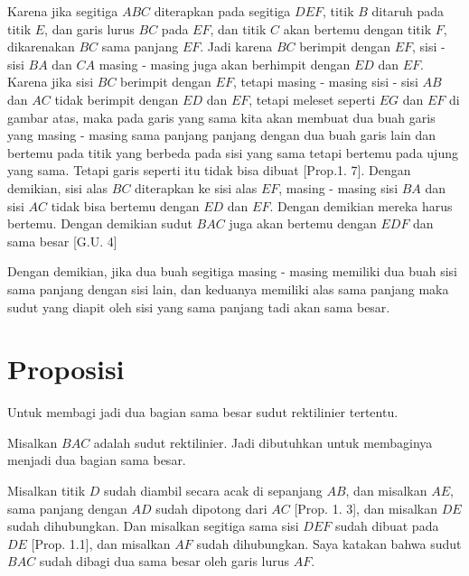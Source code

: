 \documentclass[a4paper]{book}
\begin{document}
Karena jika segitiga $ABC$ diterapkan pada segitiga $DEF$, titik $B$ ditaruh
pada titik $E$, dan garis lurus $BC$ pada $EF$, dan titik $C$ akan bertemu
dengan titik $F$, dikarenakan $BC$ sama panjang $EF$. Jadi karena $BC$
berimpit dengan $EF$, sisi - sisi $BA$ dan $CA$ masing - masing juga akan 
berhimpit dengan $ED$ dan $EF$. Karena jika sisi $BC$  berimpit dengan $EF$, 
tetapi masing - masing sisi - sisi $AB$ dan $AC$  tidak berimpit dengan 
$ED$ dan $EF$, tetapi meleset seperti $EG$ dan $EF$ di gambar atas, maka 
pada garis yang sama kita akan membuat dua buah garis yang masing - masing
sama panjang panjang dengan dua buah garis lain dan bertemu pada titik yang
berbeda pada sisi yang sama tetapi bertemu pada ujung yang sama. Tetapi garis
seperti itu tidak bisa dibuat [Prop.1. 7]. Dengan demikian, sisi alas $BC$ 
diterapkan ke sisi alas $EF$, masing - masing sisi $BA$ dan sisi  $AC$ tidak 
bisa bertemu dengan $ED$ dan $EF$. Dengan demikian mereka harus bertemu.
Dengan demikian sudut $BAC$ juga akan bertemu dengan $EDF$ dan sama besar 
[G.U. 4]

Dengan demikian, jika dua buah segitiga masing - masing memiliki dua buah 
sisi sama panjang dengan sisi lain, dan keduanya memiliki alas 
sama panjang maka sudut yang diapit oleh sisi yang sama panjang tadi akan 
sama besar.

\section*{\centering Proposisi \thesection} 
Untuk membagi jadi dua bagian sama besar sudut rektilinier tertentu.
\begin{center}
\end{center} 

Misalkan $BAC$ adalah sudut rektilinier. Jadi dibutuhkan untuk 
membaginya menjadi dua bagian sama besar.

Misalkan titik $D$ sudah diambil secara acak di sepanjang $AB$, dan misalkan
$AE$, sama panjang dengan $AD$ sudah dipotong dari $AC$ [Prop. 1. 3], dan 
misalkan $DE$ sudah dihubungkan. Dan misalkan segitiga sama sisi $DEF$ sudah
dibuat pada $DE$ [Prop. 1.1], dan misalkan $AF$ sudah dihubungkan. Saya 
katakan bahwa sudut $BAC$ sudah dibagi dua sama besar oleh garis lurus $AF$.
\end{document}
